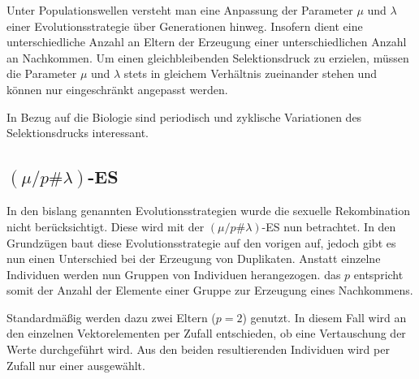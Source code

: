 Unter Populationswellen versteht man eine Anpassung der Parameter $\mu$ und $\lambda$ einer Evolutionsstrategie über Generationen hinweg. Insofern dient eine unterschiedliche Anzahl an Eltern der Erzeugung einer unterschiedlichen Anzahl an Nachkommen.
Um einen gleichbleibenden Selektionsdruck zu erzielen, müssen die Parameter $\mu$ und $\lambda$ stets in gleichem Verhältnis zueinander stehen und können nur eingeschränkt angepasst werden.

In Bezug auf die Biologie sind periodisch und zyklische Variationen des Selektionsdrucks interessant.

\subsection{$(\mu / p \# \lambda)$-ES}

In den bislang genannten Evolutionsstrategien wurde die sexuelle Rekombination nicht berücksichtigt.
Diese wird mit der $(\mu / p \# \lambda)$-ES nun betrachtet.
In den Grundzügen baut diese Evolutionsstrategie auf den vorigen auf, jedoch gibt es nun einen Unterschied bei der Erzeugung von Duplikaten.
Anstatt einzelne Individuen werden nun Gruppen von Individuen herangezogen.
das $p$ entspricht somit der Anzahl der Elemente einer Gruppe zur Erzeugung eines Nachkommens.

Standardmäßig werden dazu zwei Eltern ($p = 2$) genutzt.
In diesem Fall wird an den einzelnen Vektorelementen per Zufall entschieden, ob eine Vertauschung der Werte durchgeführt wird.
Aus den beiden resultierenden Individuen wird per Zufall nur einer ausgewählt.

